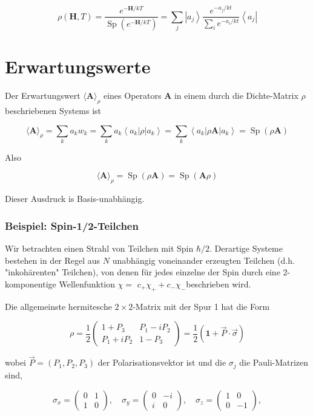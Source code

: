 \documentclass[10pt, letterpaper]{article}
\begin{document}
$$
\rho(\mathbf{H}, T)=\frac{e^{-\mathbf{H} / k T}}{\operatorname{Sp}\left(e^{-\mathbf{H} / k T}\right)}=\sum_{j}\left|a_{j}\right\rangle \frac{e^{-a_{j} / k t}}{\sum_{i} e^{-a_{i} / k t}}\left\langle a_{j}\right|
$$

\section*{Erwartungswerte}
Der Erwartungswert $\langle\mathbf{A}\rangle_{\rho}$ eines Operators $\mathbf{A}$ in einem durch die Dichte-Matrix $\rho$ beschriebenen Systems ist

$$
\langle\mathbf{A}\rangle_{\rho}=\sum_{k} a_{k} w_{k}=\sum_{k} a_{k}\left\langle a_{k}\right| \rho\left|a_{k}\right\rangle=\sum_{k}\left\langle a_{k}\right| \rho \mathbf{A}\left|a_{k}\right\rangle=\operatorname{Sp}(\rho \mathbf{A})
$$

Also

$$
\langle\mathbf{A}\rangle_{\rho}=\operatorname{Sp}(\rho \mathbf{A})=\operatorname{Sp}(\mathbf{A} \rho)
$$

Dieser Ausdruck is Basis-unabhängig.

\subsubsection*{Beispiel: Spin-1/2-Teilchen}
Wir betrachten einen Strahl von Teilchen mit Spin $\hbar / 2$. Derartige Systeme bestehen in der Regel aus $N$ unabhängig voneinander erzeugten Teilchen (d.h. "inkohärenten" Teilchen), von denen für jedes einzelne der Spin durch eine 2-komponentige Wellenfunktion $\chi=$ $c_{+} \chi_{+}+c_{-} \chi_{-}$beschrieben wird.

Die allgemeinste hermitesche $2 \times 2$-Matrix mit der Spur 1 hat die Form

$$
\rho=\frac{1}{2}\left(\begin{array}{cc}
1+P_{3} & P_{1}-i P_{2} \\
P_{1}+i P_{2} & 1-P_{3}
\end{array}\right)=\frac{1}{2}(\mathbf{1}+\vec{P} \cdot \vec{\sigma})
$$

wobei $\vec{P}=\left(P_{1}, P_{2}, P_{3}\right)$ der Polarisationsvektor ist und die $\sigma_{j}$ die Pauli-Matrizen sind,

$$
\sigma_{x}=\left(\begin{array}{cc}
0 & 1 \\
1 & 0
\end{array}\right), \quad \sigma_{y}=\left(\begin{array}{cc}
0 & -i \\
i & 0
\end{array}\right), \quad \sigma_{z}=\left(\begin{array}{cc}
1 & 0 \\
0 & -1
\end{array}\right),
$$
\end{document}
